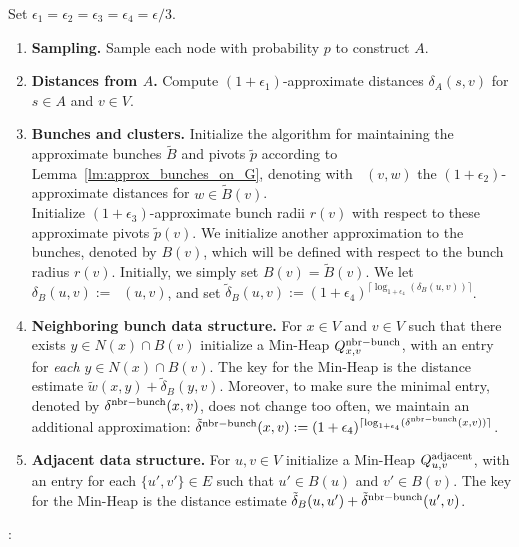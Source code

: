 \documentclass[11pt]{article}
\theoremstyle{definition}
\theoremstyle{remark}
\DeclareMathOperator{\dLNbunch}{\delta_{\tilde{B}}}
\begin{document}
Set $\epsilon_1=\epsilon_2=\epsilon_3=\epsilon_4=\epsilon/3$.
\begin{enumerate}
    \item \textbf{Sampling.} Sample each node with probability $p$ to construct $A$. \label{step:sampling}
    \item \textbf{Distances from $A$.} Compute $(1+\epsilon_1)$-approximate distances $\delta_A(s,v)$ for $s\in A$ and $v\in V$. 
    \item \textbf{Bunches and clusters.} Initialize the algorithm for maintaining the approximate bunches $\tilde B$ and pivots $\tilde p$ according to Lemma~\ref{lm:approx_bunches_on_G}, denoting with $\dLNbunch(v,w)$ the $(1+\epsilon_2)$-approximate distances for $w\in \tilde B(v)$.\\
    Initialize $(1+\epsilon_3)$-approximate bunch radii $r(v)$ with respect to these approximate pivots $\tilde p(v)$.  \label{step:A_MSSP}
    We initialize another approximation to the bunches, denoted by $B(v)$, which will be defined with respect to the bunch radius $r(v)$. Initially, we simply set $B(v)=\tilde{B}(v)$. We let $\delta_B(u,v):=\dLNbunch(u,v)$, and set $\tilde \delta_B(u,v) := (1+\epsilon_4)^{\lceil \log_{1+\epsilon_4}(\delta_B(u,v))\rceil}$. \label{step:bunches}
    \item \textbf{Neighboring bunch data structure.} For $x\in V$ and $v\in V$ such that there exists $y\in N(x)\cap B(v)$ initialize a Min-Heap $Q^{\rm{nbr-bunch}}_{x,v}$, with an entry for \emph{each} $y\in N(x)\cap B(v)$. The key for the Min-Heap is the distance estimate $ \tilde w (x, y) + \tilde\delta_B (y, v) $. Moreover, to make sure the minimal entry, denoted by $\delta^{\rm{nbr-bunch}}(x,v)$, does not change too often, we maintain an additional approximation: $\tilde \delta^{\rm{nbr-bunch}}(x,v):= (1+\epsilon_4)^{\lceil \log_{1+\epsilon_4}(\delta^{\rm{nbr-bunch}}(x,v))\rceil}$. \label{step:init_nbr_bunch}
    \item \textbf{Adjacent data structure.} For $u,v\in V$ initialize a Min-Heap $Q^{\rm{adjacent}}_{u,v}$, with an entry for each $\{u',v'\}\in E$ such that $u'\in B(u)$ and $v' \in B(v)$. The key for the Min-Heap is the distance estimate $\tilde \delta_B(u,u')+\tilde \delta^{\rm{nbr-bunch}}(u',v)$. \label{step:min_heap_nbr} 
\end{enumerate}

\noindent{}:\\
\indent {}\\
\end{document}
